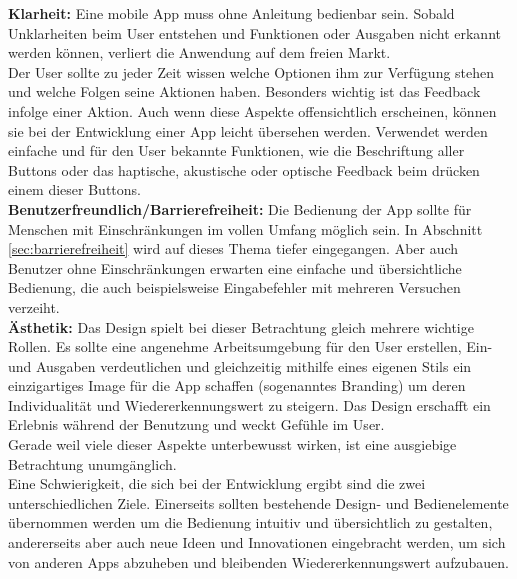 \noindent
{}
\textbf{Klarheit:} Eine mobile App muss ohne Anleitung bedienbar sein. Sobald Unklarheiten beim User entstehen und Funktionen oder Ausgaben nicht erkannt werden können, verliert die Anwendung auf dem freien Markt. \\
Der User sollte zu jeder Zeit wissen welche Optionen ihm zur Verfügung stehen und welche Folgen seine Aktionen haben. Besonders wichtig ist das Feedback infolge einer Aktion. Auch wenn diese Aspekte offensichtlich erscheinen, können sie bei der Entwicklung einer App leicht übersehen werden. Verwendet werden einfache und für den User bekannte Funktionen, wie die Beschriftung aller Buttons oder das haptische, akustische oder optische Feedback beim drücken einem dieser Buttons.\\

\noindent
{}
\textbf{Benutzerfreundlich/Barrierefreiheit:} Die Bedienung der App sollte für Menschen mit Einschränkungen im vollen Umfang möglich sein. In Abschnitt \ref{sec:barrierefreiheit} wird auf dieses Thema tiefer eingegangen. Aber auch Benutzer ohne Einschränkungen erwarten eine einfache und übersichtliche Bedienung, die auch beispielsweise  Eingabefehler mit mehreren Versuchen verzeiht.\\

\noindent
{}
\textbf{Ästhetik:} Das Design spielt bei dieser Betrachtung gleich mehrere wichtige Rollen. Es sollte eine angenehme Arbeitsumgebung für den User erstellen, Ein- und Ausgaben verdeutlichen und gleichzeitig mithilfe eines eigenen Stils ein einzigartiges Image für die App schaffen (sogenanntes Branding) um deren Individualität und Wiedererkennungswert zu steigern. Das Design erschafft ein Erlebnis während der Benutzung und weckt Gefühle im User. \\

\noindent
Gerade weil viele dieser Aspekte unterbewusst wirken, ist eine ausgiebige Betrachtung unumgänglich.\\
Eine Schwierigkeit, die sich bei der Entwicklung ergibt sind die zwei unterschiedlichen Ziele. Einerseits sollten bestehende Design- und Bedienelemente  übernommen werden um die Bedienung intuitiv und übersichtlich zu gestalten, andererseits aber auch neue Ideen und Innovationen eingebracht werden, um sich von anderen Apps abzuheben und bleibenden Wiedererkennungswert aufzubauen.
